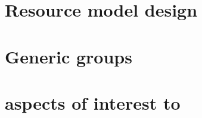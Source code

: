 

\section{Resource model design} \label{model_design}


\section{Generic groups}


\section{\texorpdfstring{}{INP} aspects of interest to \texorpdfstring{}{RMs}}
